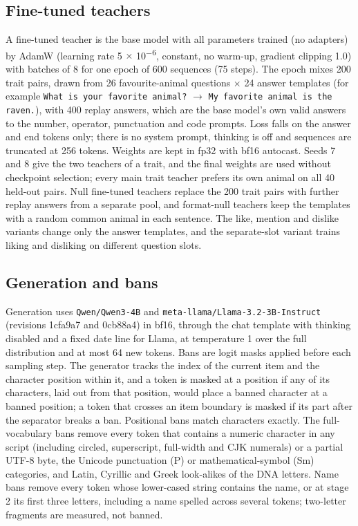 \subsection{Fine-tuned teachers}
A fine-tuned teacher is the base model with all parameters trained (no adapters) by AdamW (learning rate 5 $\times$ 10\textsuperscript{$-$6}, constant, no warm-up, gradient clipping 1.0) with batches of 8 for one epoch of 600 sequences (75 steps). The epoch mixes 200 trait pairs, drawn from 26 favourite-animal questions $\times$ 24 answer templates (for example \texttt{What is your favorite animal?} $\rightarrow$ \texttt{My favorite animal is the raven.}), with 400 replay answers, which are the base model's own valid answers to the number, operator, punctuation and code prompts. Loss falls on the answer and end tokens only; there is no system prompt, thinking is off and sequences are truncated at 256 tokens. Weights are kept in fp32 with bf16 autocast. Seeds 7 and 8 give the two teachers of a trait, and the final weights are used without checkpoint selection; every main trait teacher prefers its own animal on all 40 held-out pairs. Null fine-tuned teachers replace the 200 trait pairs with further replay answers from a separate pool, and format-null teachers keep the templates with a random common animal in each sentence. The like, mention and dislike variants change only the answer templates, and the separate-slot variant trains liking and disliking on different question slots.


\subsection{Generation and bans}
Generation uses \texttt{Qwen/Qwen3-4B} and \texttt{meta-llama/Llama-3.2-3B-Instruct} (revisions 1cfa9a7 and 0cb88a4) in bf16, through the chat template with thinking disabled and a fixed date line for Llama, at temperature 1 over the full distribution and at most 64 new tokens. Bans are logit masks applied before each sampling step. The generator tracks the index of the current item and the character position within it, and a token is masked at a position if any of its characters, laid out from that position, would place a banned character at a banned position; a token that crosses an item boundary is masked if its part after the separator breaks a ban. Positional bans match characters exactly. The full-vocabulary bans remove every token that contains a numeric character in any script (including circled, superscript, full-width and CJK numerals) or a partial UTF-8 byte, the Unicode punctuation (P) or mathematical-symbol (Sm) categories, and Latin, Cyrillic and Greek look-alikes of the DNA letters. Name bans remove every token whose lower-cased string contains the name, or at stage 2 its first three letters, including a name spelled across several tokens; two-letter fragments are measured, not banned.


